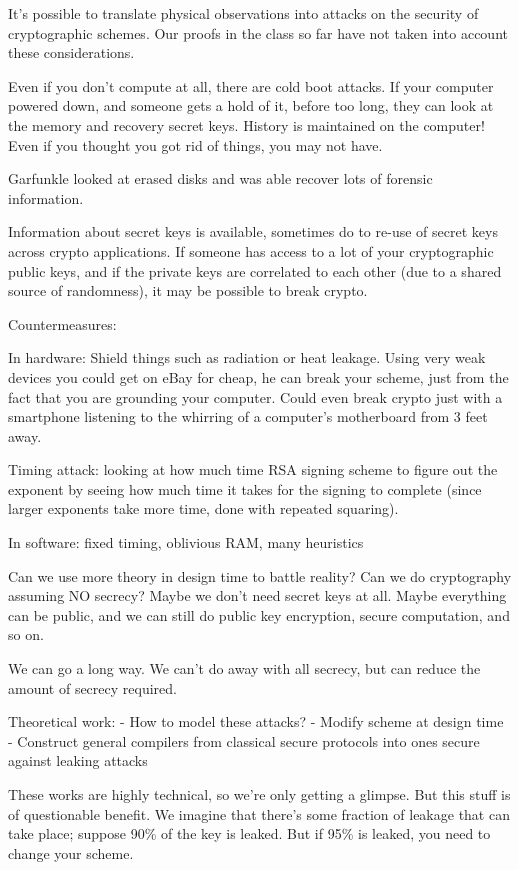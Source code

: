 \documentclass[10pt]{article}
\begin{document}
It's possible to translate physical observations into attacks on the security of cryptographic schemes. Our proofs in the class so far have not taken into account these considerations.

Even if you don't compute at all, there are cold boot attacks. If your computer powered down, and someone gets a hold of it, before too long, they can look at the memory and recovery secret keys. History is maintained on the computer! Even if you thought you got rid of things, you may not have.

Garfunkle looked at erased disks and was able recover lots of forensic information.

Information about secret keys is available, sometimes do to re-use of secret keys across crypto applications. If someone has access to a lot of your cryptographic public keys, and if the private keys are correlated to each other (due to a shared source of randomness), it may be possible to break crypto.

Countermeasures:

In hardware: Shield things such as radiation or heat leakage. Using very weak devices you could get on eBay for cheap, he can break your scheme, just from the fact that you are grounding your computer. Could even break crypto just with a smartphone listening to the whirring of a computer's motherboard from 3 feet away.

Timing attack: looking at how much time RSA signing scheme to figure out the exponent by seeing how much time it takes for the signing to complete (since larger exponents take more time, done with repeated squaring).

In software: fixed timing, oblivious RAM, many heuristics

Can we use more theory in design time to battle reality? Can we do cryptography assuming NO secrecy? Maybe we don't need secret keys at all. Maybe everything can be public, and we can still do public key encryption, secure computation, and so on.

We can go a long way. We can't do away with all secrecy, but can reduce the amount of secrecy required.

Theoretical work:
- How to model these attacks?
- Modify scheme at design time
- Construct general compilers from classical secure protocols into ones secure against leaking attacks

These works are highly technical, so we're only getting a glimpse. But this stuff is of questionable benefit. We imagine that there's some fraction of leakage that can take place; suppose 90\% of the key is leaked. But if 95\% is leaked, you need to change your scheme.
\end{document}

